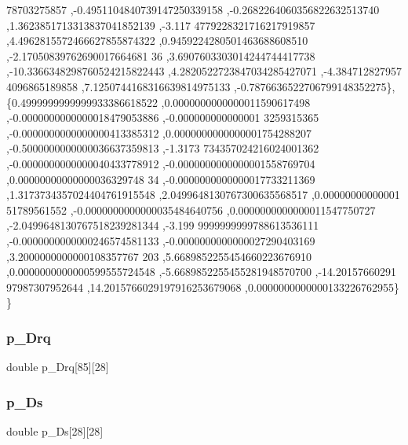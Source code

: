 \begin{DoxyCode}
      78703275857 ,-0.4951104840739147250339158 ,-0.2682264060356822632513740 ,1.3623851713313837041852139 ,-3.117
      4779228321716217919857 ,4.4962815572466627855874322 ,0.9459224280501463688608510 ,-2.17050839762690017664681
      36 ,3.6907603303014244744417738 ,-10.3366348298760524215822443 ,4.2820522723847034285427071 ,-4.384712827957
      4096865189858 ,7.1250744168316639814975133 ,-0.7876636522706799148352275\},
\{0.4999999999999933386618522 ,0.0000000000000011590617498 ,-0.0000000000000018479053886 ,-0.000000000000001
      3259315365 ,-0.0000000000000000413385312 ,0.0000000000000001754288207 ,-0.5000000000000036637359813 ,-1.3173
      734357024216024001362 ,-0.0000000000000040433778912 ,-0.0000000000000001558769704 ,0.00000000000000036329748
      34 ,-0.0000000000000017733211369 ,1.3173734357024404761915548 ,2.0499648130767300635568517 ,0.00000000000001
      51789561552 ,-0.0000000000000035484640756 ,0.0000000000000011547750727 ,-2.0499648130767518239281344 ,-3.199
      9999999999788613536111 ,-0.0000000000000246574581133 ,-0.0000000000000027290403169 ,3.2000000000000108357767
      203 ,5.6689852255454660223676910 ,0.0000000000000599555724548 ,-5.6689852255455281948570700 ,-14.20157660291
      97987307952644 ,14.2015766029197916253679068 ,0.0000000000000133226762955\}
\}
\end{DoxyCode}
\mbox{\label{a01002_a801685c4e42ef6f5fec9319cb136011c}} 
\subsubsection{\texorpdfstring{p\+\_\+\+Drq}{p\_Drq}}
{\footnotesize\ttfamily double p\+\_\+\+Drq\mbox{[}85\mbox{]}\mbox{[}28\mbox{]}}

\mbox{\label{a01002_a12faa16cf926b3799b733b5da2993946}} 
\subsubsection{\texorpdfstring{p\+\_\+\+Ds}{p\_Ds}}
{\footnotesize\ttfamily double p\+\_\+\+Ds\mbox{[}28\mbox{]}\mbox{[}28\mbox{]}}

